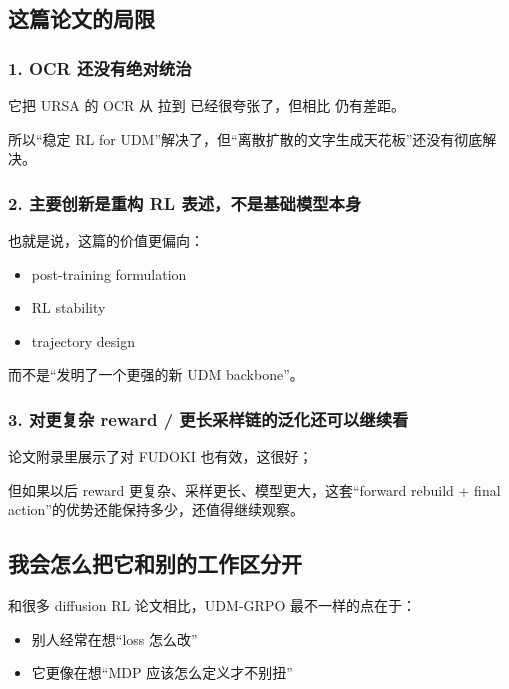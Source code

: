 \subsection{这篇论文的局限}

\subsubsection{1. OCR 还没有绝对统治}

它把 URSA 的 OCR 从  拉到  已经很夸张了，但相比  仍有差距。

所以“稳定 RL for UDM”解决了，但“离散扩散的文字生成天花板”还没有彻底解决。

\subsubsection{2. 主要创新是重构 RL 表述，不是基础模型本身}

也就是说，这篇的价值更偏向：

\begin{itemize}[leftmargin=1.5em]
  \item post-training formulation
  \item RL stability
  \item trajectory design
\end{itemize}

而不是“发明了一个更强的新 UDM backbone”。

\subsubsection{3. 对更复杂 reward / 更长采样链的泛化还可以继续看}

论文附录里展示了对 FUDOKI 也有效，这很好；

但如果以后 reward 更复杂、采样更长、模型更大，这套“forward rebuild + final action”的优势还能保持多少，还值得继续观察。

\subsection{我会怎么把它和别的工作区分开}

和很多 diffusion RL 论文相比，UDM-GRPO 最不一样的点在于：

\begin{itemize}[leftmargin=1.5em]
  \item 别人经常在想“loss 怎么改”
  \item 它更像在想“MDP 应该怎么定义才不别扭”
\end{itemize}

